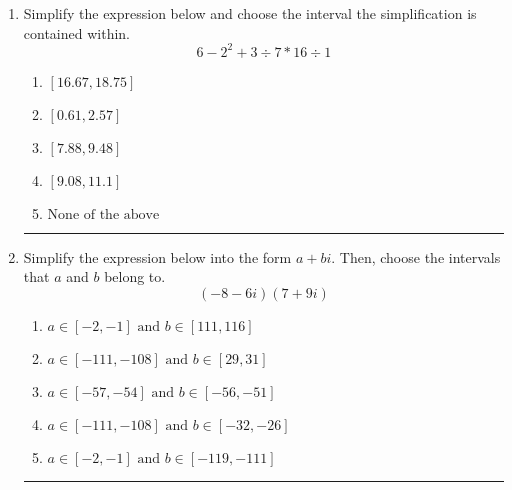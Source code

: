 \documentclass[14pt]{extbook}
\newcommand{\litem}[1]{\item#1\hspace*{-1cm}\rule{\textwidth}{0.4pt}}
\begin{document}
\begin{enumerate}
{\begin{enumerate}[label=\Alph*.]
\end{enumerate} }
\litem{
Simplify the expression below and choose the interval the simplification is contained within.\[ 6 - 2^2 + 3 \div 7 * 16 \div 1 \]\begin{enumerate}[label=\Alph*.]
\item \( [16.67, 18.75] \)
\item \( [0.61, 2.57] \)
\item \( [7.88, 9.48] \)
\item \( [9.08, 11.1] \)
\item \( \text{None of the above} \)

\end{enumerate} }
\litem{
Simplify the expression below into the form $a+bi$. Then, choose the intervals that $a$ and $b$ belong to.\[ (-8 - 6 i)(7 + 9 i) \]\begin{enumerate}[label=\Alph*.]
\item \( a \in [-2, -1] \text{ and } b \in [111, 116] \)
\item \( a \in [-111, -108] \text{ and } b \in [29, 31] \)
\item \( a \in [-57, -54] \text{ and } b \in [-56, -51] \)
\item \( a \in [-111, -108] \text{ and } b \in [-32, -26] \)
\item \( a \in [-2, -1] \text{ and } b \in [-119, -111] \)

\end{enumerate} }
\end{enumerate}
\end{document}
